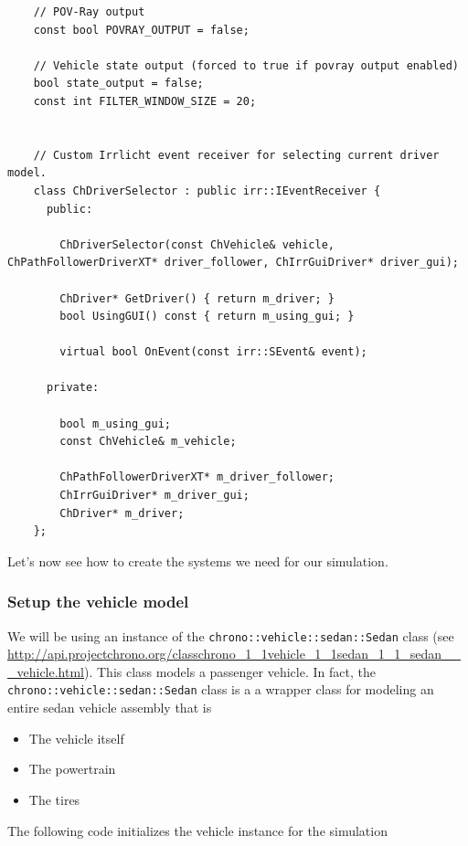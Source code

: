 \begin{lstlisting}
    // POV-Ray output
    const bool POVRAY_OUTPUT = false;

    // Vehicle state output (forced to true if povray output enabled)
    bool state_output = false;
    const int FILTER_WINDOW_SIZE = 20;


    // Custom Irrlicht event receiver for selecting current driver model.
    class ChDriverSelector : public irr::IEventReceiver {
      public:

        ChDriverSelector(const ChVehicle& vehicle, ChPathFollowerDriverXT* driver_follower, ChIrrGuiDriver* driver_gui);

        ChDriver* GetDriver() { return m_driver; }
        bool UsingGUI() const { return m_using_gui; }

        virtual bool OnEvent(const irr::SEvent& event);

      private:

        bool m_using_gui;
        const ChVehicle& m_vehicle;

        ChPathFollowerDriverXT* m_driver_follower;
        ChIrrGuiDriver* m_driver_gui;
        ChDriver* m_driver;
    };
\end{lstlisting}


Let's now see how to create the systems we need for our simulation.


\subsubsection{Setup the vehicle model}

We will be using an instance of the \lstinline{chrono::vehicle::sedan::Sedan} class (see \url{http://api.projectchrono.org/classchrono_1_1vehicle_1_1sedan_1_1_sedan___vehicle.html}).
This class models a passenger vehicle. In fact, the \lstinline{chrono::vehicle::sedan::Sedan} class is a  a wrapper class for modeling an entire sedan vehicle assembly
that is
\begin{itemize}
\item The vehicle itself
\item The powertrain
\item The tires
\end{itemize}

The following code initializes the vehicle instance for the simulation

